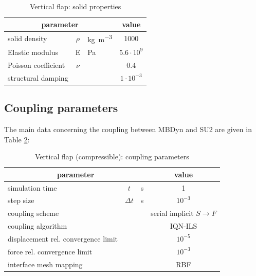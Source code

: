 \begin{table}[!htb]
	\begin{center}
		\begin{tabular}{ l c  l | c } 
			\multicolumn{3}{c|}{parameter} & value   \\ 
			\hline
			solid density  & $\rho$ & \si{kg.m^{-3}} & 1000    \\
			Elastic modulus  & E & \si{Pa} & $ 5.6 \cdot 10^9$    \\
			Poisson coefficient & $\nu$ & & $0.4$  \\
			structural damping & & & $1 \cdot 10^{-3}$ \\
		\end{tabular}
	\end{center}
	\caption{Vertical flap: solid properties}
	\label{table:comp-solid}
\end{table}

\subsection{Coupling parameters}

The main data concerning the coupling between MBDyn and SU2 are given in Table \ref{table:comp-coupling}:

\begin{table}[!htb]
	\begin{center}
		\begin{tabular}{ l c  l| c } 
			\multicolumn{3}{c|}{parameter} & value   \\ 
			\hline
			simulation time  & $t$& \si{s} & 1      \\
			step size & $\Delta t$ & \si{s} & $10^{-3}$   \\
			\hline
			coupling scheme & & & serial implicit $S\rightarrow F$  \\
			coupling algorithm & & &  IQN-ILS  \\
			displacement rel. convergence limit & & & $10^{-5}$ \\
			force rel. convergence limit &&  & $10^{-3}$  \\
      		interface mesh mapping & & & RBF  \\
			
		\end{tabular}
	\end{center}
	\caption{Vertical flap (compressible): coupling parameters}
	\label{table:comp-coupling}
\end{table}


